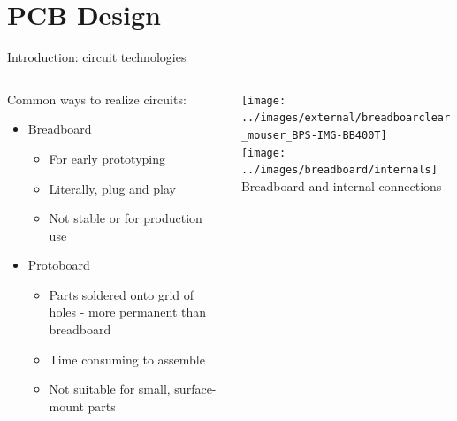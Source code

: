 \documentclass{beamer}
\begin{document}
\section{PCB Design}
\begin{frame}{Introduction: circuit technologies}
  \begin{columns}[T]
    \begin{column}{.6\textwidth}
      Common ways to realize circuits:
      \begin{itemize}
        \item Breadboard
        \begin{itemize}
          \item For early prototyping
          \item Literally, plug and play
          \item Not stable or for production use
        \end{itemize}
        \item Protoboard
        \begin{itemize}
          \item Parts soldered onto grid of holes - more permanent than breadboard
          \item Time consuming to assemble
          \item Not suitable for small, surface-mount parts
        \end{itemize}
      \end{itemize}
    \end{column}

    \begin{column}{0.4\textwidth} \centering
      \texttt{[image: ../images/external/breadboarclear\_mouser\_BPS-IMG-BB400T]} \\
      \texttt{[image: ../images/breadboard/internals]} \\
      Breadboard and internal connections
    \end{column}
  \end{columns}
\end{frame}
\end{document}

